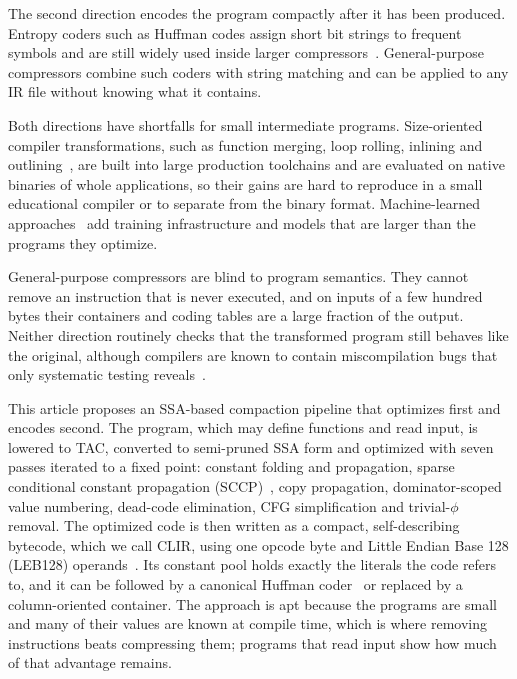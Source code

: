 \documentclass{ieeeaccess}
\newcommand{\clir}{CLIR}
\begin{document}
The second direction encodes the program compactly after it has been produced. Entropy coders such as Huffman codes assign short bit strings to frequent symbols and are still widely used inside larger compressors~\cite{moffat2019huffman}. General-purpose compressors combine such coders with string matching and can be applied to any IR file without knowing what it contains.

Both directions have shortfalls for small intermediate programs. Size-oriented compiler transformations, such as function merging, loop rolling, inlining and outlining~\cite{rocha2020salssa,rocha2021hyfm,rocha2022rolag,damasio2021inlining,theodoridis2022inlining,chabbi2021ios}, are built into large production toolchains and are evaluated on native binaries of whole applications, so their gains are hard to reproduce in a small educational compiler or to separate from the binary format. Machine-learned approaches~\cite{trofin2021mlgo,jain2022posetrl,cummins2023llm,cummins2021compilergym,cummins2021programl} add training infrastructure and models that are larger than the programs they optimize.

General-purpose compressors are blind to program semantics. They cannot remove an instruction that is never executed, and on inputs of a few hundred bytes their containers and coding tables are a large fraction of the output. Neither direction routinely checks that the transformed program still behaves like the original, although compilers are known to contain miscompilation bugs that only systematic testing reveals~\cite{chen2020testing}.

This article proposes an SSA-based compaction pipeline that optimizes first and encodes second. The program, which may define functions and read input, is lowered to TAC, converted to semi-pruned SSA form and optimized with seven passes iterated to a fixed point: constant folding and propagation, sparse conditional constant propagation (SCCP)~\cite{wegman1991sccp}, copy propagation, dominator-scoped value numbering, dead-code elimination, CFG simplification and trivial-$\phi$ removal. The optimized code is then written as a compact, self-describing bytecode, which we call \clir{}, using one opcode byte and Little Endian Base 128 (LEB128) operands~\cite{w3c2019wasm}. Its constant pool holds exactly the literals the code refers to, and it can be followed by a canonical Huffman coder~\cite{schwartz1964canonical} or replaced by a column-oriented container. The approach is apt because the programs are small and many of their values are known at compile time, which is where removing instructions beats compressing them; programs that read input show how much of that advantage remains.
\end{document}
